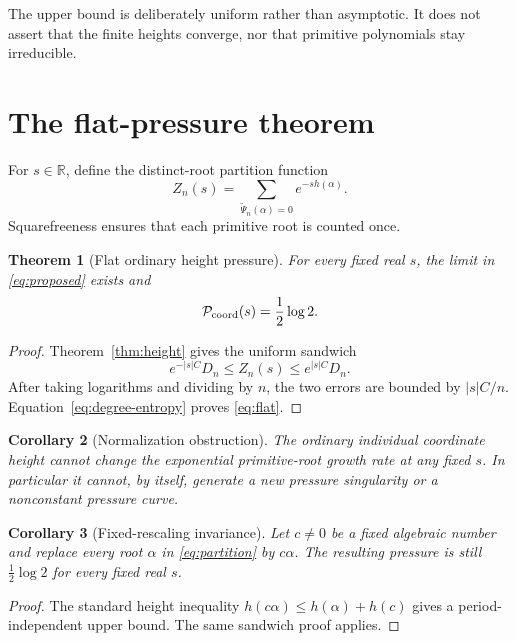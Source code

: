 \documentclass[11pt]{article}
\newtheorem{theorem}{Theorem}[section]
\newtheorem{corollary}[theorem]{Corollary}
\theoremstyle{remark}
\newcommand{\htw}{h}
\begin{document}
The upper bound is deliberately uniform rather than asymptotic.  It does not
assert that the finite heights converge, nor that primitive polynomials stay
irreducible.

\section{The flat-pressure theorem}
For $s\in\mathbb R$, define the distinct-root partition function
\begin{equation}\label{eq:partition}
Z_n(s)=\sum_{\widetilde\Psi_n(\alpha)=0}e^{-s\htw(\alpha)}.
\end{equation}
Squarefreeness ensures that each primitive root is counted once.

\begin{theorem}[Flat ordinary height pressure]\label{thm:flat}
For every fixed real $s$, the limit in \eqref{eq:proposed} exists and
\begin{equation}\label{eq:flat}
\mathcal P_{\rm coord}(s)=\frac12\log2.
\end{equation}
\end{theorem}
\begin{proof}
Theorem~\ref{thm:height} gives the uniform sandwich
\begin{equation}\label{eq:sandwich}
e^{-|s|C}D_n\le Z_n(s)\le e^{|s|C}D_n.
\end{equation}
After taking logarithms and dividing by $n$, the two errors are bounded by
$|s|C/n$.  Equation~\eqref{eq:degree-entropy} proves \eqref{eq:flat}.
\end{proof}

\begin{corollary}[Normalization obstruction]
The ordinary individual coordinate height cannot change the exponential
primitive-root growth rate at any fixed $s$.  In particular it cannot, by
itself, generate a new pressure singularity or a nonconstant pressure curve.
\end{corollary}

\begin{corollary}[Fixed-rescaling invariance]\label{cor:scaling}
Let $c\ne0$ be a fixed algebraic number and replace every root $\alpha$ in
\eqref{eq:partition} by $c\alpha$.  The resulting pressure is still
$\frac12\log2$ for every fixed real $s$.
\end{corollary}
\begin{proof}
The standard height inequality
$h(c\alpha)\le h(\alpha)+h(c)$ gives a period-independent upper bound.  The
same sandwich proof applies.
\end{proof}
\end{document}
